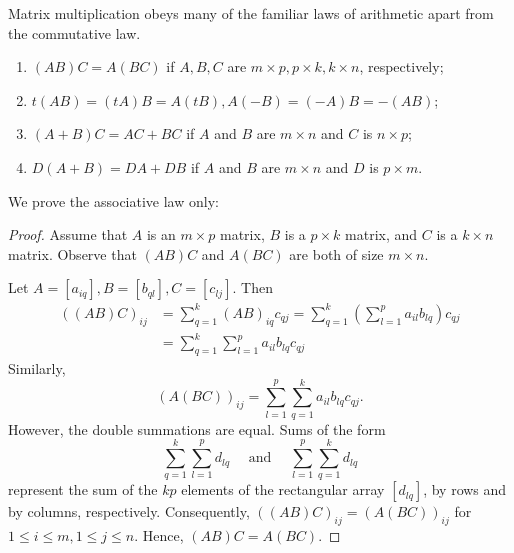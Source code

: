 \documentclass[../main.tex]{subfiles}
\begin{document}
\begin{theorem}
	\label{theo:theo_1_1}
	 Matrix multiplication obeys many of the familiar laws of arithmetic apart from the commutative law.
\begin{enumerate}[label=\textbf{\arabic*}), noitemsep]
	\item $(A B) C=A(B C)$ if $A, B, C$ are $m \times p, p \times k, k \times n$, respectively;
	\item$t(A B)=(t A) B=A(t B), A(-B)=(-A) B=-(A B)$;
	\item $(A+B) C=A C+B C$ if $A$ and $B$ are $m \times n$ and $C$ is $n \times p$;
	\item$D(A+B)=D A+D B$ if $A$ and $B$ are $m \times n$ and $D$ is $p \times m$.
\end{enumerate}
\end{theorem}

We prove the associative law only:

\begin{proof}
	Assume that $A$ is an $m \times p$ matrix, $B$ is a $p \times k$ matrix, and $C$ is a $k \times n$ matrix. Observe that $(A B) C$ and $A(B C)$ are both of size $m \times n$.


	Let $A=\left[a_{i q}\right], B=\left[b_{q l}\right], C=\left[c_{l j}\right]$. Then
	$$
	\begin{aligned}
	((A B) C)_{i j} &=\sum_{q=1}^{k}(A B)_{i q} c_{q j}=\sum_{q=1}^{k}\left(\sum_{l=1}^{p} a_{i l} b_{l q}\right) c_{q j} \\
	&=\sum_{q=1}^{k} \sum_{l=1}^{p} a_{i l} b_{l q} c_{q j}
	\end{aligned}
	$$
	Similarly,
	$$
	(A(B C))_{i j}=\sum_{l=1}^{p} \sum_{q=1}^{k} a_{i l} b_{l q} c_{q j} .
	$$
	However, the double summations are equal. Sums of the form
	$$
	\sum_{q=1}^{k} \sum_{l=1}^{p} d_{l q} \quad \text { and } \quad \sum_{l=1}^{p} \sum_{q=1}^{k} d_{l q}
	$$
	represent the sum of the $k p$ elements of the rectangular array $\left[d_{l q}\right]$, by rows and by columns, respectively. Consequently, $((A B) C)_{i j}=(A(B C))_{i j}$ for $1 \leq i \leq m, 1 \leq j \leq n .$ Hence, $(A B) C=A(B C)$.
	\end{proof}
\end{document}
